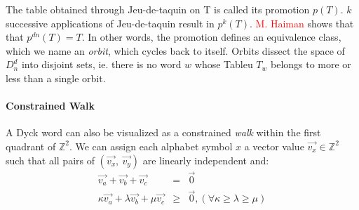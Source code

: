 \documentclass[nonatbib,numbers,10pt]{sigplanconf}
\newcommand\todo[1]{\textcolor{red}{#1}}
\begin{document}
The table obtained through Jeu-de-taquin on T is called its promotion $p(T)$. $k$ successive applications of Jeu-de-taquin result in $p^k(T)$. \todo{M. Haiman} shows that that $p^{dn}(T)=T$. In other words, the promotion defines an equivalence class, which we name an \textit{orbit}, which cycles back to itself. Orbits dissect the space of $D^d_n$ into disjoint sets, ie. there is no word $w$ whose Tableu $T_w$ belongs to more or less than a single orbit.
\paragraph{Constrained Walk}
A Dyck word can also be visualized as a constrained \textit{walk} within the first quadrant of $\mathbb{Z}^2$. We can assign each alphabet symbol $x$ a vector value $\vec{v_x} \in \mathbb{Z}^2$ such that all pairs of $(\vec{v_x},\ \vec{v_y})$ are linearly independent and:
\begin{eqnarray}
\vec{v_a} + \vec{v_b} + \vec{v_c} &=& \vec{0} \\
\kappa\vec{v_a} + \lambda\vec{v_b} + \mu\vec{v_c} &\geq & \vec{0},  (\forall \kappa \geq \lambda \geq \mu)
\end{eqnarray}
\end{document}
